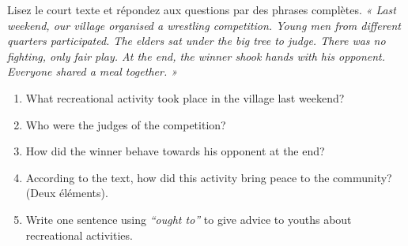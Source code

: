 \documentclass[11pt]{article}
\begin{document}
\begin{exercice}
Lisez le court texte et répondez aux questions par des phrases complètes.
\textit{« Last weekend, our village organised a wrestling competition. Young men from different quarters participated. The elders sat under the big tree to judge. There was no fighting, only fair play. At the end, the winner shook hands with his opponent. Everyone shared a meal together. »}
\begin{enumerate}
    \item What recreational activity took place in the village last weekend?
    \item Who were the judges of the competition?
    \item How did the winner behave towards his opponent at the end?
    \item According to the text, how did this activity bring peace to the community? (Deux éléments).
    \item Write one sentence using \textit{``ought to''} to give advice to youths about recreational activities.
\end{enumerate}
\end{exercice}
\end{document}
